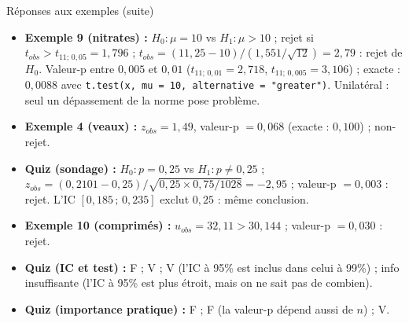 \documentclass{BeamerTemplate}
\begin{document}
\begin{frame}[t]{Réponses aux exemples (suite)}
  \footnotesize
  \begin{itemize}\itemsep 1.5mm
    \item \textbf{Exemple 9 (nitrates) :} $H_0 : \mu = 10$ vs $H_1 : \mu > 10$ ; rejet si $t_{obs} > t_{11;\,0{,}05} = 1{,}796$ ; $t_{obs} = (11{,}25 - 10)/(1{,}551/\sqrt{12}) = 2{,}79$ : rejet de $H_0$. Valeur-p entre $0{,}005$ et $0{,}01$ ($t_{11;\,0{,}01} = 2{,}718$, $t_{11;\,0{,}005} = 3{,}106$) ; exacte : $0{,}0088$ avec \texttt{t.test(x, mu = 10, alternative = "greater")}. Unilatéral : seul un dépassement de la norme pose problème.
    \item \textbf{Exemple 4 (veaux) :} $z_{obs} = 1{,}49$, valeur-p $= 0{,}068$ (exacte : $0{,}100$) ; non-rejet.
    \item \textbf{Quiz (sondage) :} $H_0 : p = 0{,}25$ vs $H_1 : p \ne 0{,}25$ ; $z_{obs} = (0{,}2101 - 0{,}25)/\sqrt{0{,}25 \times 0{,}75/1028} = -2{,}95$ ; valeur-p $= 0{,}003$ : rejet. L'IC $[0{,}185 \,;\, 0{,}235]$ exclut $0{,}25$ : même conclusion.
    \item \textbf{Exemple 10 (comprimés) :} $u_{obs} = 32{,}11 > 30{,}144$ ; valeur-p $= 0{,}030$ : rejet.
    \item \textbf{Quiz (IC et test) :} F ; V ; V (l'IC à 95\% est inclus dans celui à 99\%) ; info insuffisante (l'IC à 95\% est plus étroit, mais on ne sait pas de combien).
    \item \textbf{Quiz (importance pratique) :} F ; F (la valeur-p dépend aussi de $n$) ; V.
  \end{itemize}
\end{frame}
\end{document}
